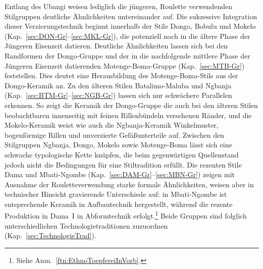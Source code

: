 Entlang des \mbox{Ubangi} weisen lediglich die jüngeren, \mbox{Roulette} verwendenden Stilgruppen deutliche Ähnlichkeiten untereinander auf. Die sukzessive Integration dieser Verzierungstechnik beginnt innerhalb der Stile Dongo, Bobulu und Mokelo (Kap.~\ref{sec:DON-Gr}--\ref{sec:MKL-Gr}), die potenziell noch in die ältere Phase der Jüngeren Eisenzeit datieren. Deutliche Ähnlichkeiten lassen sich bei den Randformen der Dongo-Gruppe und der in die nachfolgende mittlere Phase der Jüngeren Eisenzeit datierenden Motenge-Boma-Gruppe (Kap.~\ref{sec:MTB-Gr}) feststellen. Dies deutet eine Herausbildung des Motenge-Boma-Stils aus der Dongo-Keramik an. Zu den älteren Stilen Batalimo-Maluba und \mbox{Ngbanja} (Kap.~\ref{sec:BTM-Gr}--\ref{sec:NGB-Gr}) lassen sich nur schwächere Parallelen erkennen. So zeigt die Keramik der Dongo-Gruppe die auch bei den älteren Stilen beobachtbaren innenseitig mit feinen Rillenbündeln versehenen Ränder, und die Mokelo-Keramik weist wie auch die \mbox{Ngbanja}-Keramik Winkelmuster, bogenförmige Rillen und unverzierte Gefäßunterteile auf. Zwischen den Stilgruppen \mbox{Ngbanja}, Dongo, Mokelo sowie Motenge-Boma lässt sich eine schwache typologische Kette knüpfen, die beim gegenwärtigen Quellenstand jedoch nicht die Bedingungen für eine Stiltradition erfüllt. Die rezenten Stile Dama und Mbati-Ngombe (Kap.~\ref{sec:DAM-Gr}--\ref{sec:MBN-Gr}) zeigen mit Ausnahme der Rouletteverwendung starke formale Ähnlichkeiten, weisen aber in technischer Hinsicht gravierende Unterschiede auf: in Mbati-Ngombe ist entsprechende Keramik in Aufbautechnik hergestellt, während die rezente Produktion in Dama~I in Abformtechnik erfolgt.\footnote{Siehe Anm.~\ref{ftn:EthnoToepfereiInVorb}.} Beide Gruppen sind folglich unterschiedlichen Technologietraditionen zuzuordnen (Kap.~\ref{sec:TechnologieTrad}). 

